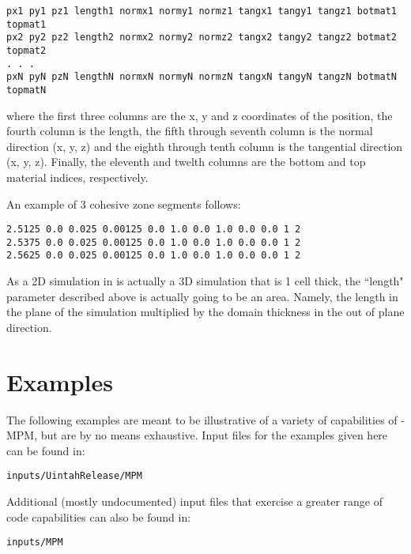 \begin{lstlisting}[backgroundcolor=\color{background}]
px1 py1 pz1 length1 normx1 normy1 normz1 tangx1 tangy1 tangz1 botmat1 topmat1
px2 py2 pz2 length2 normx2 normy2 normz2 tangx2 tangy2 tangz2 botmat2 topmat2
. . .
pxN pyN pzN lengthN normxN normyN normzN tangxN tangyN tangzN botmatN topmatN
\end{lstlisting}

where the first three columns are the x, y and z coordinates of the position, 
the fourth column is the length, the fifth through seventh column is the normal
direction (x, y, z) and the eighth through tenth column is the tangential
direction (x, y, z).  Finally, the eleventh and twelth columns are the bottom
and top material indices, respectively.

An example of 3 cohesive zone segments follows:

\begin{lstlisting}[backgroundcolor=\color{background}]
2.5125 0.0 0.025 0.00125 0.0 1.0 0.0 1.0 0.0 0.0 1 2
2.5375 0.0 0.025 0.00125 0.0 1.0 0.0 1.0 0.0 0.0 1 2
2.5625 0.0 0.025 0.00125 0.0 1.0 0.0 1.0 0.0 0.0 1 2
\end{lstlisting}

As a 2D simulation in \Vaango is actually a 3D simulation that is 1 cell thick,
the ``length" parameter described above is actually going to be an area.
Namely, the length in the plane of the simulation multiplied by the domain
thickness in the out of plane direction.


%
\section{Examples} \label{Sec:ExamplesMPM}

The following examples are meant to be illustrative of a variety of
capabilities of \Vaango-MPM, but are by no means exhaustive.  Input files
for the examples given here can be found in:
\begin{lstlisting}[backgroundcolor=\color{background}]
inputs/UintahRelease/MPM
\end{lstlisting}

Additional (mostly undocumented) input files that exercise a greater range
of code capabilities can also be found in:
\begin{lstlisting}[backgroundcolor=\color{background}]
inputs/MPM
\end{lstlisting}

